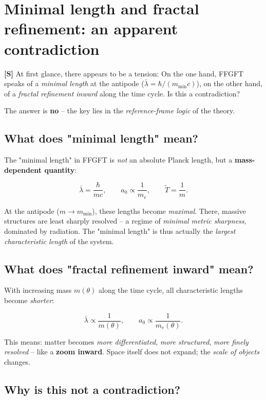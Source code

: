 \section{Minimal length and fractal refinement: an apparent contradiction}

\textbf{[S]} At first glance, there appears to be a tension:
On the one hand, FFGFT speaks of a \emph{minimal length} at the antipode
($\bar\lambda = \hbar/(m_\text{min} c)$), on the other hand, of a
\emph{fractal refinement inward} along the time cycle.
Is this a contradiction?

The answer is \textbf{no} -- the key lies in the \emph{reference-frame
	logic} of the theory.

\subsection{What does "minimal length" mean?}

The "minimal length" in FFGFT is \emph{not} an absolute Planck length,
but a \textbf{mass-dependent quantity}:

\[
\bar\lambda = \frac{\hbar}{m c}, \qquad
a_0 \propto \frac{1}{m_e}, \qquad
\tilde{T} = \frac{1}{m}.
\]

At the antipode ($m \to m_\text{min}$), these lengths become \emph{maximal}.
There, massive structures are least sharply resolved --
a regime of \emph{minimal metric sharpness}, dominated by radiation.
The "minimal length" is thus actually the \emph{largest characteristic
	length} of the system.

\subsection{What does "fractal refinement inward" mean?}

With increasing mass $m(\theta)$ along the time cycle, all
characteristic lengths become \emph{shorter}:

\[
\bar\lambda \propto \frac{1}{m(\theta)}, \qquad
a_0 \propto \frac{1}{m_e(\theta)}.
\]

This means: matter becomes \emph{more differentiated}, \emph{more structured},
\emph{more finely resolved} -- like a \textbf{zoom inward}.
Space itself does not expand; the \emph{scale of objects} changes.

\subsection{Why is this not a contradiction?}

